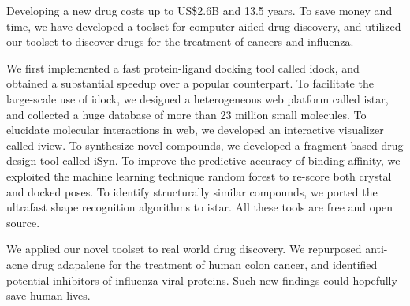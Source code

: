 Developing a new drug costs up to US\$2.6B and 13.5 years. To save money and time, we have developed a toolset for computer-aided drug discovery, and utilized our toolset to discover drugs for the treatment of cancers and influenza.

We first implemented a fast protein-ligand docking tool called idock, and obtained a substantial speedup over a popular counterpart. To facilitate the large-scale use of idock, we designed a heterogeneous web platform called istar, and collected a huge database of more than 23 million small molecules. To elucidate molecular interactions in web, we developed an interactive visualizer called iview. To synthesize novel compounds, we developed a fragment-based drug design tool called iSyn. To improve the predictive accuracy of binding affinity, we exploited the machine learning technique random forest to re-score both crystal and docked poses. To identify structurally similar compounds, we ported the ultrafast shape recognition algorithms to istar. All these tools are free and open source.

We applied our novel toolset to real world drug discovery. We repurposed anti-acne drug adapalene for the treatment of human colon cancer, and identified potential inhibitors of influenza viral proteins. Such new findings could hopefully save human lives.
